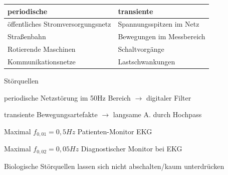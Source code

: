 \documentclass[a4paper]{article}
\begin{document}
\begin{multicols}{3}


  \begin{tabular}{l|l}
    periodische                       & transiente                \\\hline
    öffentliches Stromversorgungsnetz & Spannungsspitzen im Netz  \\
    Straßenbahn                       & Bewegungen im Messbereich \\
    Rotierende Maschinen              & Schaltvorgänge            \\
    Kommunikationsnetze               & Lastschwankungen
  \end{tabular}

  Störquellen
  \begin{itemize*}
    \item periodische Netzstörung im 50Hz Bereich $\rightarrow$ digitaler Filter
    \item transiente Bewegungsartefakte $\rightarrow$ langsame A. durch Hochpass
    \begin{itemize*}
      \item Maximal $f_{0,01}=0,5 Hz$ Patienten-Monitor EKG
      \item Maximal $f_{0,02}=0,05Hz$ Diagnostischer Monitor bei EKG
    \end{itemize*}
    \item Biologische Störquellen lassen sich nicht abschalten/kaum unterdrücken
  \end{itemize*}


\end{multicols}
\end{document}
